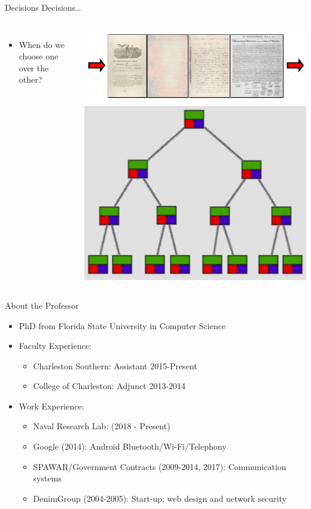 \documentclass{beamer}
\begin{document}
\begin{frame}{Decisions Decisions\ldots}
\begin{columns}[c]
\begin{itemize}
\item When do we choose one over the other?
\end{itemize}
\includegraphics[width=1.0\textwidth]{../imgs/queue.png}
\includegraphics[width=1.0\textwidth]{../imgs/binary-tree-color.png}
\end{columns}
\end{frame}

\begin{frame}{About the Professor}
\begin{itemize}
\item PhD from Florida State University in Computer Science
\item Faculty Experience:
\begin{itemize}
\item Charleston Southern: Assistant 2015-Present
\item College of Charleston: Adjunct 2013-2014
\end{itemize}
\item Work Experience:
\begin{itemize}
\item Naval Research Lab: (2018 - Present)
\item Google (2014): Android Bluetooth/Wi-Fi/Telephony
\item SPAWAR/Government Contracts (2009-2014, 2017): Communication systems
\item DenimGroup (2004-2005): Start-up; web design and network security
\end{itemize}
\end{itemize}
\end{frame}
\end{document}
